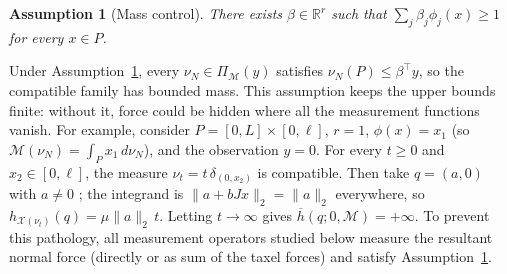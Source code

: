 \documentclass[11pt,a4paper]{article}
\theoremstyle{plain}
\newtheorem{assumption}[theorem]{Assumption}
\newtheorem{example}[theorem]{Example}
\newcommand{\R}{\mathbb{R}}
\newcommand{\X}{\mathcal X}
\begin{document}
\begin{assumption}[Mass control]
    \label{ass:mass_control}
    There exists $\beta\in\R^r$ such that $\sum_j\beta_j\phi_j(x)\ge1$ for every $x\in P$.
\end{assumption}
Under Assumption~\ref{ass:mass_control}, every $\nu_N\in\Pi_{\mathcal M}(y)$ satisfies $\nu_N(P)\le \beta^\top y$, 
so the compatible family has bounded mass. 
This assumption keeps the upper bounds finite: without it, force could be hidden where all the measurement functions vanish. 
For example, consider $P=[0,L]\times[0,\ell]$, $r=1$, $\phi(x)=x_1$ (so $\mathcal M(\nu_N)=\int_Px_1\,d\nu_N$), and the observation $y=0$. 
For every $t\ge0$ and $x_2\in[0,\ell]$, the measure $\nu_t=t\,\delta_{(0,x_2)}$ is compatible. 
Then take $q=(a,0)$ with $a\neq0$ ; the integrand is $\|a+bJx\|_2=\|a\|_2$ everywhere, so $h_{\X(\nu_t)}(q)=\mu\|a\|_2\,t$. 
Letting $t\to\infty$ gives $\overline h(q;0,\mathcal M)=+\infty$. 
To prevent this pathology, all measurement operators studied below measure the resultant normal force (directly or as sum of the taxel forces) and satisfy Assumption~\ref{ass:mass_control}. 

\end{document}
